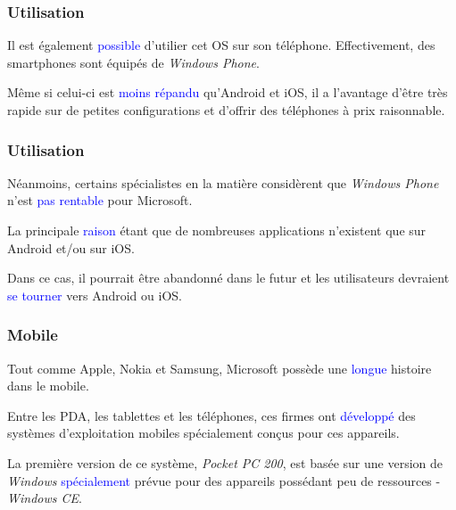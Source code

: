 \documentclass[aspectratio=169]{beamer}
\begin{document}
\begin{frame}
  \frametitle{Utilisation}
  Il est également \textcolor{blue}{possible} d'utilier cet OS sur son
  téléphone. Effectivement, des smartphones sont équipés de \textit{Windows Phone}.

  \hspace{0.5cm}

  Même si celui-ci est \textcolor{blue}{moins répandu} qu'Android et iOS, il a
  l'avantage d'être très rapide sur de petites configurations et d'offrir des
  téléphones à prix raisonnable.
\end{frame}

\begin{frame}
  \frametitle{Utilisation}
  Néanmoins, certains spécialistes en la matière considèrent que \textit{Windows Phone}
  n'est \textcolor{blue}{pas rentable} pour Microsoft.

  \hspace{0.5cm}

  La principale \textcolor{blue}{raison} étant que de nombreuses
  applications n'existent que sur Android et/ou sur iOS.

  \hspace{0.5cm}

  Dans ce cas, il pourrait être abandonné dans le futur et les utilisateurs
  devraient \textcolor{blue}{se tourner} vers Android ou iOS.
\end{frame}

\begin{frame}
  \frametitle{Mobile}
  Tout comme Apple, Nokia et Samsung, Microsoft possède une
  \textcolor{blue}{longue} histoire dans le mobile.

  \hspace{0.5cm}

  Entre les PDA, les tablettes et les téléphones, ces firmes ont
  \textcolor{blue}{développé} des systèmes d'exploitation mobiles spécialement
  conçus pour ces appareils.

  \hspace{0.5cm}

  La première version de ce système, \textit{Pocket PC 200}, est
  basée sur une version de \textit{Windows} \textcolor{blue}{spécialement} prévue pour
  des appareils possédant peu de ressources - \textit{Windows CE}.
\end{frame}
\end{document}
